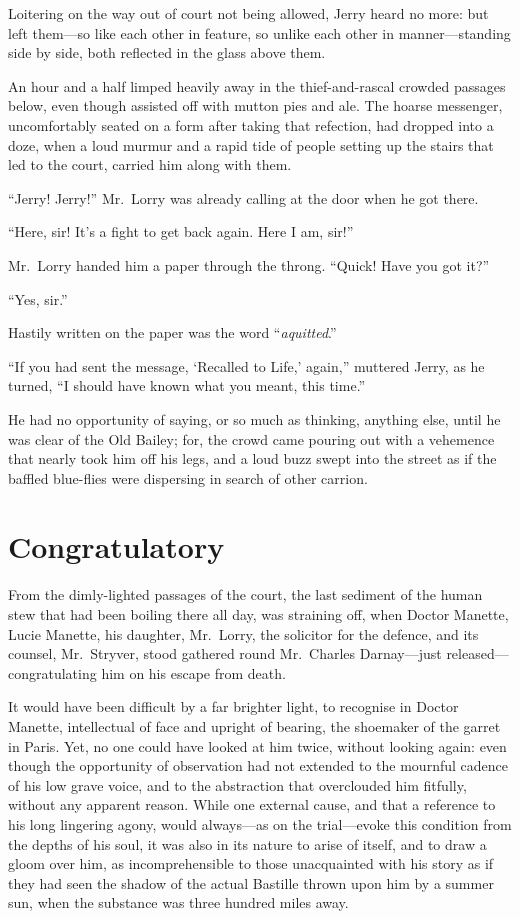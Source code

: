 Loitering on the way out of court not being allowed, Jerry heard no
more:  but left them---so like each other in feature, so unlike each
other in manner---standing side by side, both reflected in the glass
above them.

An hour and a half limped heavily away in the thief-and-rascal crowded
passages below, even though assisted off with mutton pies and ale.
The hoarse messenger, uncomfortably seated on a form after taking that
refection, had dropped into a doze, when a loud murmur and a rapid
tide of people setting up the stairs that led to the court, carried
him along with them.

``Jerry!  Jerry!''  Mr.\ Lorry was already calling at the door when
he got there.

``Here, sir!  It's a fight to get back again.  Here I am, sir!''

Mr.\ Lorry handed him a paper through the throng.
``Quick!  Have you got it?''

``Yes, sir.''

Hastily written on the paper was the word ``\emph{aquitted}.''

``If you had sent the message, `Recalled to Life,' again,'' muttered
Jerry, as he turned, ``I should have known what you meant, this time.''

He had no opportunity of saying, or so much as thinking, anything
else, until he was clear of the Old Bailey; for, the crowd came
pouring out with a vehemence that nearly took him off his legs, and a
loud buzz swept into the street as if the baffled blue-flies were
dispersing in search of other carrion.



\chapter{Congratulatory}


From the dimly-lighted passages of the court, the last sediment of the
human stew that had been boiling there all day, was straining off,
when Doctor Manette, Lucie Manette, his daughter, Mr.\ Lorry, the
solicitor for the defence, and its counsel, Mr.\ Stryver, stood
gathered round Mr.\ Charles Darnay---just released---congratulating him
on his escape from death.

It would have been difficult by a far brighter light, to recognise in
Doctor Manette, intellectual of face and upright of bearing, the
shoemaker of the garret in Paris.  Yet, no one could have looked at
him twice, without looking again:  even though the opportunity of
observation had not extended to the mournful cadence of his low grave
voice, and to the abstraction that overclouded him fitfully, without
any apparent reason.  While one external cause, and that a reference
to his long lingering agony, would always---as on the trial---evoke this
condition from the depths of his soul, it was also in its nature to
arise of itself, and to draw a gloom over him, as incomprehensible to
those unacquainted with his story as if they had seen the shadow of
the actual Bastille thrown upon him by a summer sun, when the
substance was three hundred miles away.

